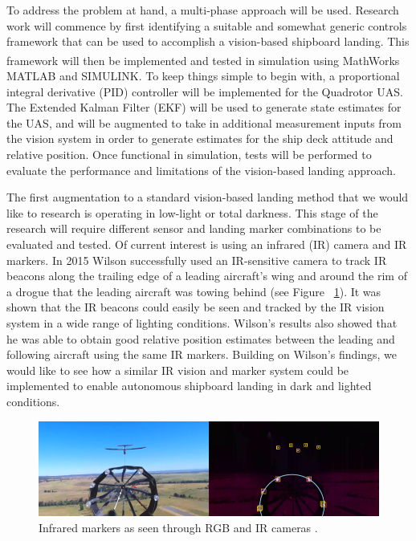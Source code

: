 \documentclass[12pt, letterpaper]{article}
\begin{document}
To address the problem at hand, a multi-phase approach will be used.  Research work will commence by first identifying a suitable and somewhat generic controls framework that can be used to accomplish a vision-based shipboard landing.  This framework will then be implemented and tested in simulation using MathWorks\textsuperscript{\textregistered} MATLAB and SIMULINK.  To keep things simple to begin with, a proportional integral derivative (PID) controller will be implemented for the Quadrotor UAS.  The Extended Kalman Filter (EKF) will be used to generate state estimates for the UAS, and will be augmented to take in additional measurement inputs from the vision system in order to generate estimates for the ship deck attitude and relative position.  Once functional in simulation, tests will be performed to evaluate the performance and limitations of the vision-based landing approach.

The first augmentation to a standard vision-based landing method that we would like to research is operating in low-light or total darkness.  This stage of the research will require different sensor and landing marker combinations to be evaluated and tested.  Of current interest is using an infrared (IR) camera and IR markers.  In 2015 Wilson \cite{WilsonDB.2015} successfully used an IR-sensitive camera to track IR beacons along the trailing edge of a leading aircraft's wing and around the rim of a drogue that the leading aircraft was towing behind (see Figure ~\ref{fig:irmarkers}).  It was shown that the IR beacons could easily be seen and tracked by the IR vision system in a wide range of lighting conditions.  Wilson's results also showed that he was able to obtain good relative position estimates between the leading and following aircraft using the same IR markers.  Building on Wilson's findings, we would like to see how a similar IR vision and marker system could be implemented to enable autonomous shipboard landing in dark and lighted conditions. 

\begin{figure}[t] %
   \centering
   \includegraphics[trim = 0mm 0mm 0mm 0mm,clip,width=6in]{ir_drogue.png}
   \caption{Infrared markers as seen through RGB and IR cameras \cite{WilsonDB.2015}.}
   \label{fig:irmarkers}
\end{figure}
\end{document}
